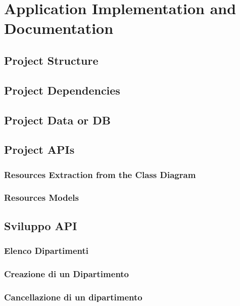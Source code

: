 \section{Application Implementation and Documentation}
\label{secD4:ApplicationImplementationAndDocumentation}
\subsection{Project Structure}
\subsection{Project Dependencies}
\subsection{Project Data or DB}
\subsection{Project APIs}
\subsubsection{Resources Extraction from the Class Diagram}
\subsubsection{Resources Models}
\subsection{Sviluppo API}
\subsubsection{Elenco Dipartimenti}
\subsubsection{Creazione di un Dipartimento}
\subsubsection{Cancellazione di un dipartimento}